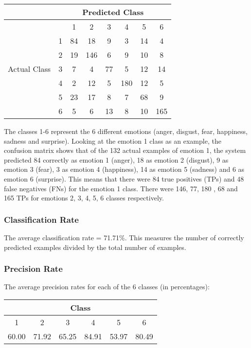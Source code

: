 \documentclass[a4paper,11pt]{article}
\begin{document}
\begin{center}
 \begin{tabular}{| c |p{0.5cm} | c | c | c | c | c | c|} 
 \hline
   & \multicolumn{7}{|c|}{Predicted Class} \\
  \hline
 \multirow{7}{*}{Actual Class} &  & 1 & 2 & 3 & 4 & 5 & 6 \\  [1ex]
 \cline{2-8}
 & 1 & 84 & 18 & 9 & 3 & 14 & 4 \\ 
 \cline{2-8}
 & 2 & 19 & 146 & 6 & 9 & 10 & 8 \\
 \cline{2-8}
 & 3 & 7 & 4 & 77 & 5 & 12 & 14 \\
 \cline{2-8}
 & 4 & 2 & 12 & 5 & 180 & 12 & 5 \\
 \cline{2-8}
 & 5 & 23 & 17 & 8 & 7 & 68 & 9 \\ 
 \cline{2-8}
 & 6 & 5 & 6 & 13 & 8 & 10 & 165 \\ 
 \hline

\end{tabular}
\end{center}


The classes 1-6 represent the 6 different emotions (anger, disgust, fear, happiness, sadness and surprise). Looking at the emotion 1 class as an example, the confusion matrix shows that of the 132 actual examples of emotion 1, the system predicted 84 correctly as emotion 1 (anger), 18 as emotion 2 (disgust), 9 as emotion 3 (fear), 3 as emotion 4 (happiness), 14 as emotion 5 (sadness) and 6 as emotion 6 (surprise). This means that there were 84 true positives (TPs) and 48 false negatives (FNs) for the emotion 1 class. There were 146, 77, 180 , 68 and 165 TPs for emotions 2, 3, 4, 5, 6 classes respectively. 

\subsubsection{Classification Rate}

The average classification rate = 71.71\%. This measures the number of correctly predicted examples divided by the total number of examples.   

\subsubsection{Precision Rate}

The average precision rates for each of the 6 classes (in percentages):

\begin{center}
 \begin{tabular}{| c | c | c | c | c | c |} 
 \hline
 \multicolumn{6}{|c|}{Class} \\
 \hline
  1 & 2 & 3 & 4 & 5 & 6 \\  [1ex]
 \hline
 60.00 & 71.92 & 65.25 & 84.91 & 53.97 & 80.49 \\ 
 \hline
 \end{tabular}
\end{center}
\end{document}
